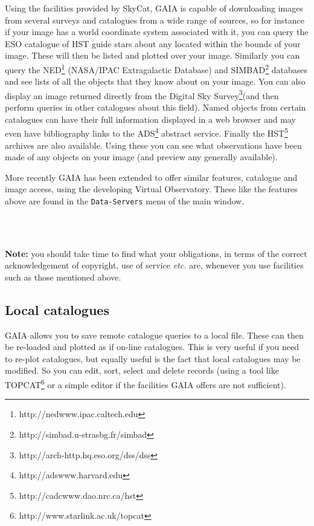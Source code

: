 \documentclass[twoside,11pt]{article}
\newcommand{\htmladdnormallinkfoot}[2]{#1\footnote{#2}}
\newcommand{\htmladdnormallink}[2]{#1}
\renewcommand{\_}{\texttt{\symbol{95}}}
\newcommand{\mytt}[1]{{\texttt{#1}}}
\begin{document}
Using the facilities provided by
\htmladdnormallink{SkyCat}{http://archive.eso.org/skycat}, GAIA is
capable of downloading images from several surveys and catalogues from a
wide range of sources, so for instance if your image has a world
coordinate system associated with it, you can query the ESO catalogue of
HST guide stars about any located within the bounds of your image. These
will then be listed and plotted over your image.  Similarly you can
query the
\htmladdnormallinkfoot{NED}{http://nedwww.ipac.caltech.edu}
(NASA/IPAC Extragalactic Database) and
\htmladdnormallinkfoot{SIMBAD}{http://simbad.u-strasbg.fr/simbad}
databases and see lists of all the objects that they know about on your
image. You can also display an image returned directly from the
\htmladdnormallinkfoot{Digital Sky Survey}
{http://arch-http.hq.eso.org/dss/dss}(and then perform queries in other
catalogues about this field). Named objects from certain catalogues can
have their full information displayed in a web browser and may even have
bibliography links to the
\htmladdnormallinkfoot{ADS}{http://adswww.harvard.edu} abstract
service.  Finally the
\htmladdnormallinkfoot{HST}{http://cadcwww.dao.nrc.ca/hst} archives
are also available. Using these you can see what observations have
been made of any objects on your image (and preview any generally
available).

More recently GAIA has been extended to offer similar features,
catalogue and image access, using the developing Virtual
Observatory. These like the features above are found in the
\mytt{Data-Servers} menu of the main window.

\begin{htmlonly}
\\
\\
\end{htmlonly}

{\bf Note:} you should take time to find what your obligations, in
terms of the correct acknowledgement of copyright, use of service
{\em etc.} are, whenever you use facilities such as those mentioned
above.

\subsection{Local catalogues}
GAIA allows you to save remote catalogue queries to a local file. These
can then be re-loaded and plotted as if on-line catalogues. This is very
useful if you need to re-plot catalogues, but equally useful is the fact
that local catalogues may be modified. So you can edit, sort, select and
delete records (using a tool like
\htmladdnormallinkfoot{TOPCAT}{http://www.starlink.ac.uk/topcat} or a
simple editor if the facilities GAIA offers are not sufficient).
\end{document}
